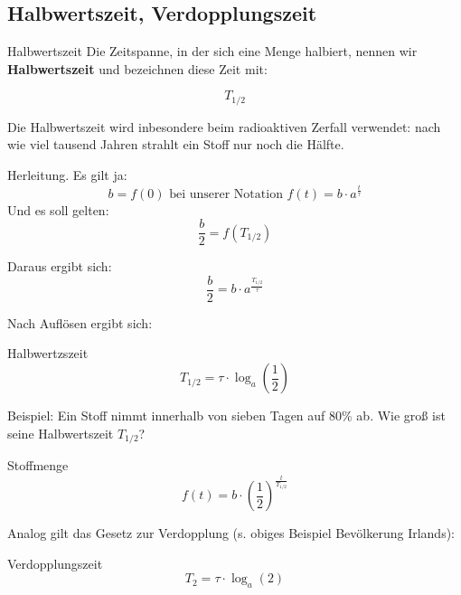 \subsection{Halbwertszeit, Verdopplungszeit}

\begin{definition}{Halbwertszeit}{}
Die Zeitspanne, in der sich eine Menge halbiert, nennen wir
\textbf{Halbwertszeit} und bezeichnen diese Zeit mit:

$$T_{1/2}$$
\end{definition}

Die Halbwertszeit wird inbesondere
  beim radioaktiven Zerfall verwendet: nach wie viel tausend Jahren strahlt
  ein Stoff nur noch die Hälfte.

  Herleitung. Es gilt ja:
  $$b=f(0) \textrm{ bei unserer Notation } f(t) = b\cdot{}a^\frac{t}\tau$$
  Und es soll gelten:
  $$\frac{b}2 = f(T_{1/2})$$

  Daraus ergibt sich:
  $$\frac{b}2 = b\cdot{}a^{\frac{T_{1/2}}{\tau}}$$

    Nach Auflösen ergibt sich:
    
\begin{gesetz}{Halbwertzszeit}{}
  $$T_{1/2} = \tau\cdot{}\log_a\left(\frac12\right)$$
\end{gesetz}

\newpage
Beispiel: Ein Stoff nimmt innerhalb von sieben Tagen auf 80\% ab. Wie
groß ist seine Halbwertszeit $T_{1/2}$?


\begin{gesetz}{Stoffmenge}{}
  $$f(t) = b\cdot{}\left(\frac12\right)^\frac{t}{T_{1/2}}$$
\end{gesetz}

\newpage
{}

Analog gilt das Gesetz zur Verdopplung (s. obiges Beispiel Bevölkerung Irlands):
\begin{gesetz}{Verdopplungszeit}{}
  $$T_2 = \tau\cdot{}\log_a(2)$$
\end{gesetz}




\newpage

